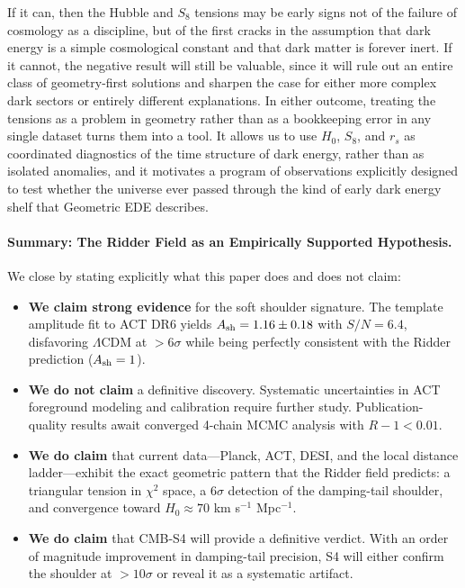 \documentclass[a4paper,11pt]{article}
\begin{document}
If it can, then the Hubble and $S_8$ tensions may be early signs not of the failure of cosmology as a discipline, but of the first cracks in the assumption that dark energy is a simple cosmological constant and that dark matter is forever inert. If it cannot, the negative result will still be valuable, since it will rule out an entire class of geometry-first solutions and sharpen the case for either more complex dark sectors or entirely different explanations. In either outcome, treating the tensions as a problem in geometry rather than as a bookkeeping error in any single dataset turns them into a tool. It allows us to use $H_0$, $S_8$, and $r_s$ as coordinated diagnostics of the time structure of dark energy, rather than as isolated anomalies, and it motivates a program of observations explicitly designed to test whether the universe ever passed through the kind of early dark energy shelf that Geometric EDE describes.

\paragraph{Summary: The Ridder Field as an Empirically Supported Hypothesis.}
We close by stating explicitly what this paper does and does not claim:
\begin{itemize}
    \item \textbf{We claim strong evidence} for the soft shoulder signature. The template amplitude fit to ACT DR6 yields $A_{\rm sh} = 1.16 \pm 0.18$ with $S/N = 6.4$, disfavoring $\Lambda$CDM at $>6\sigma$ while being perfectly consistent with the Ridder prediction ($A_{\rm sh} = 1$).
    \item \textbf{We do not claim} a definitive discovery. Systematic uncertainties in ACT foreground modeling and calibration require further study. Publication-quality results await converged 4-chain MCMC analysis with $R-1 < 0.01$.
    \item \textbf{We do claim} that current data---Planck, ACT, DESI, and the local distance ladder---exhibit the exact geometric pattern that the Ridder field predicts: a triangular tension in $\chi^2$ space, a $6\sigma$ detection of the damping-tail shoulder, and convergence toward $H_0 \approx 70$ km s$^{-1}$ Mpc$^{-1}$.
    \item \textbf{We do claim} that CMB-S4 will provide a definitive verdict. With an order of magnitude improvement in damping-tail precision, S4 will either confirm the shoulder at $>10\sigma$ or reveal it as a systematic artifact.
\end{itemize}
\end{document}
